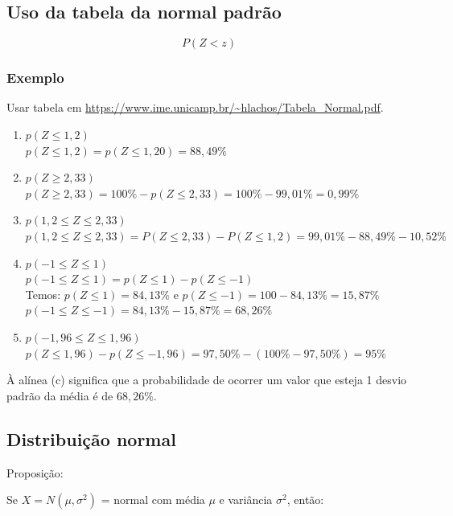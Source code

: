 \documentclass[a4paper]{article}
\begin{document}
	\subsection{Uso da tabela da normal padrão}
	
	\begin{equation*}
		P(Z < z)
	\end{equation*}
	
	\subsubsection{Exemplo}
	
	Usar tabela em \url{https://www.ime.unicamp.br/~hlachos/Tabela_Normal.pdf}.
	
	\begin{enumerate}[label=\alph*.]
		\item $p(Z \leq 1,2)$ \\
		$p(Z \leq 1,2) = p(Z \leq 1,20) = 88,49\%$
		\item $p(Z \geq 2,33)$ \\ $p(Z \geq 2,33) = 100\% - p(Z \leq 2,33) = 100\% - 99,01\% = 0,99\%$
		\item $p(1,2 \leq Z \leq 2,33)$ \\
		$p(1,2 \leq Z \leq 2,33) = P(Z \leq 2,33) - P(Z \leq 1,2) = 99,01\% - 88,49\% - 10,52\%$
		\item $p(-1 \leq Z \leq 1)$ \\
		$p(-1 \leq Z \leq 1) = p(Z \leq 1) - p(Z \leq -1)$ \\
		Temos: $p(Z \leq 1) = 84,13\%$ e $p(Z \leq -1) = 100-84,13\% = 15,87\%$ \\
		$p(-1 \leq Z \leq -1) = 84,13\% - 15,87\% = 68,26\%$
		\item $p(-1,96 \leq Z \leq 1,96)$ \\
		$p(Z \leq 1,96) - p(Z \leq -1,96) = 97,50\% - (100\% - 97,50\%) = 95\%$
	\end{enumerate}

	À alínea (c) significa que a probabilidade de ocorrer um valor que esteja 1 desvio padrão da média é de $68,26\%$.
	
	\subsection{Distribuição normal}
	
	Proposição:
	
	Se $X = N(\mu, \sigma^2)$ = normal com média $\mu$ e variância $\sigma^2$, então:
	
\end{document}

